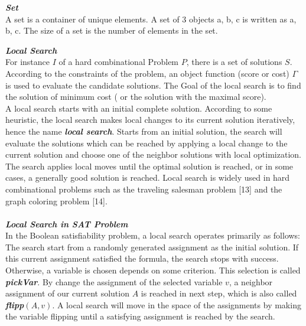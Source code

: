 \documentclass[12pt,a4paper,twoside]{scrartcl}
\numberwithin{equation}{section}
\begin{document}
\emph{\textbf{Set}}\\
A set is a container of unique elements. A set of 3 objects a, b, c is written as {a, b, c}. The
size of a set is the number of elements in the set.


\emph{\textbf{Local Search}}\\
For instance $I$ of a hard combinational Problem $P$, there is a set of solutions $S$.  According to the constraints of the problem, an object function (score or cost) $\Gamma$ is used to evaluate the candidate solutions. The Goal of the local search is to find the solution of minimum cost ( or the solution with the maximal score).\\
A local search starts with an initial complete solution. According to some heuristic, the local search makes local changes to its current solution iteratively, hence the name \emph{\textbf{local search}}. Starts from an initial solution, the search will evaluate the solutions which can be reached by applying a local change to the current solution and choose one of the neighbor solutions with local optimization. The search applies local moves until the optimal solution is reached, or in some cases, a generally good solution is reached.  Local search is widely used in hard combinational problems such as the traveling salesman problem [13] and the graph coloring problem [14]. \\
\\
\emph{\textbf{Local Search in SAT Problem}}\\
In the Boolean satisfiability problem, a local search operates primarily as follows: The search start from a randomly generated assignment as the initial solution. If this current assignment satisfied the formula, the search stops with success. Otherwise, a variable is chosen depends on some criterion. This selection is called \emph{\textbf{pickVar}}. By change the assignment of the selected variable $v$, a neighbor assignment of our current solution $A$ is reached in next step, which is also called  \emph{\textbf{flipp$(A,v)$}}. A local search will move in the space of the assignments by making the variable flipping until a satisfying assignment is reached by the search. \\
\end{document}
